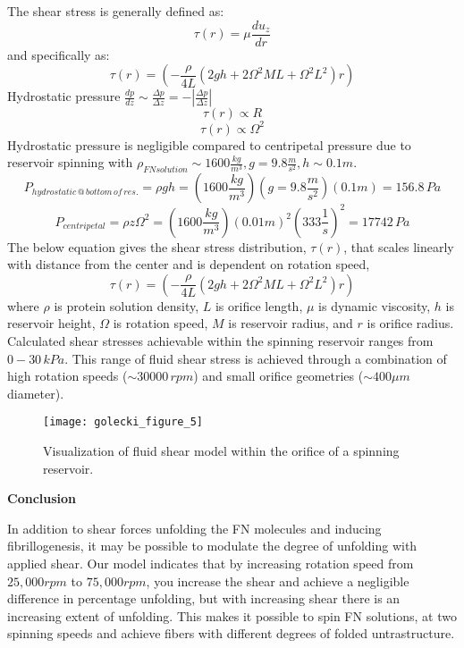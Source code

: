 The shear stress is generally defined as:
\[\tau(r)=\mu\frac{du_z}{dr}\]
and specifically as:
\[\tau(r)=(-\frac{\rho}{4L}(2gh+2\Omega^2ML+\Omega^2L^2)r)\]
Hydrostatic pressure $\frac{dp}{dz}\sim\frac{\Delta p}{\Delta z} = -|\frac{\Delta p}{\Delta z}|$
\[\tau(r)\propto R\]
\[\tau(r)\propto \Omega^2\]
Hydrostatic pressure is negligible compared to centripetal pressure due to reservoir spinning with $\rho_{FN solution}\sim 1600\frac{kg}{m^3},g=9.8\frac{m}{s^2},h\sim 0.1m.$
\[P_{hydrostatic\,@\,bottom\,of\,res.} = \rho gh 
= (1600\frac{kg}{m^3})
(g=9.8\frac{m}{s^2})
(0.1m)
= 156.8\,Pa
\]
\[P_{centripetal} = \rho z\Omega^2
= (1600\frac{kg}{m^3})
(0.01m)^2
(333\frac{1}{s})^2
= 17742\,Pa
\]
The below equation gives the shear stress distribution, $\tau(r)$, that scales linearly with distance from the center and is dependent on rotation speed,
\[\tau(r)=(-\frac{\rho}{4L}(2gh+2\Omega^2ML+\Omega^2L^2)r)\]
where $\rho$ is protein solution density, $L$ is orifice length, $\mu$ is dynamic viscosity, $h$ is reservoir height, $\Omega$ is rotation speed, $M$ is reservoir radius, and $r$ is orifice radius. Calculated shear stresses achievable within the spinning reservoir ranges from $0-30\,kPa$. This range of fluid shear stress is achieved through a combination of high rotation speeds ($\sim 30000\,rpm$) and small orifice geometries ($\sim 400\mu m$ diameter).  

\renewcommand{\thefigure}{5}
\begin{figure}[h]
  \begin{center}
    \texttt{[image: golecki\_figure\_5]}
  \end{center}
  \caption{Visualization of fluid shear model within the orifice of a spinning reservoir.}
\end{figure}

\noindent
\textbf{Conclusion}

In addition to shear forces unfolding the FN molecules and inducing fibrillogenesis, it may be possible to modulate the degree of unfolding with applied shear. Our model indicates that by increasing rotation speed from $25,000rpm$ to $75,000rpm$, you increase the shear and achieve a negligible difference in percentage unfolding, but with increasing shear there is an increasing extent of unfolding. This makes it possible to spin FN solutions, at two spinning speeds and achieve fibers with different degrees of folded untrastructure. 


